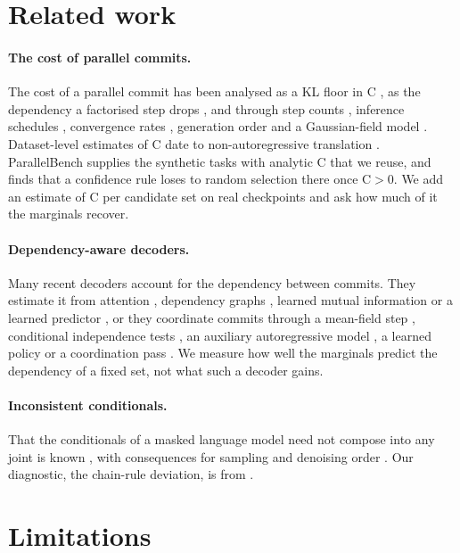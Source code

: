 \documentclass{article}
\newcommand{\C}{\mathrm{C}}
\begin{document}
\section{Related work}
\label{sec:bg}

\paragraph{The cost of parallel commits.} The cost of a parallel commit has been
analysed as a KL floor in $\C$ \cite{parallelbench,huang}, as the dependency a
factorised step drops \cite{dcd}, and through step counts \cite{feng}, inference
schedules \cite{schedules}, convergence rates \cite{intrinsicdep}, generation order
\cite{genorder} and a Gaussian-field model \cite{gaussiantc}. Dataset-level estimates of
$\C$ date to non-autoregressive translation \cite{huang}. ParallelBench
\cite{parallelbench} supplies the synthetic tasks with analytic $\C$ that we reuse, and
finds that a confidence rule loses to random selection there once $\C>0$. We add an
estimate of $\C$ per candidate set on real checkpoints and ask how much of it the
marginals recover.

\paragraph{Dependency-aware decoders.} Many recent decoders account for the dependency
between commits. They estimate it from attention \cite{dapd,geoblock,clad,dos},
dependency graphs \cite{dawn}, learned mutual information \cite{neuralmi} or a learned
predictor \cite{demask}, or they coordinate commits through a mean-field step
\cite{meanfield}, conditional independence tests \cite{punt}, an auxiliary
autoregressive model \cite{locallycoherent}, a learned policy \cite{tracelock} or a
coordination pass \cite{cocommit}. We measure how well the marginals predict the
dependency of a fixed set, not what such a decoder gains.

\paragraph{Inconsistent conditionals.} That the conditionals of a masked language model
need not compose into any joint is known \cite{mlminconsist}, with consequences for
sampling \cite{glauber} and denoising order \cite{pathdenoise}. Our diagnostic, the
chain-rule deviation, is from \cite{chainruledev}.

\section{Limitations}
\label{sec:limitations}
\end{document}
